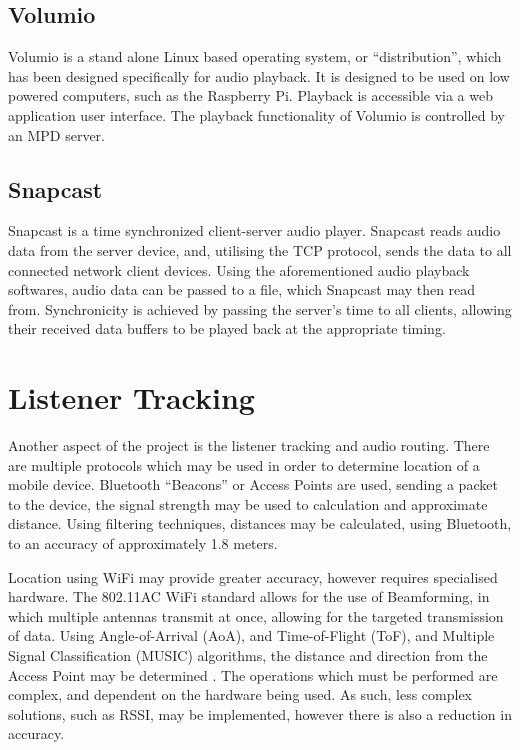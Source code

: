 \documentclass[11pt,a4paper,headinclude=false,footinclude=false]{scrreprt}
\begin{document}
\subsection{Volumio}\label{volumio}

Volumio is a stand alone Linux based operating system, or
``distribution'', which has been designed specifically for audio
playback\cite{Volumio18}. It is designed to be used on low powered
computers, such as the Raspberry Pi. Playback is accessible via a web
application user interface. The playback functionality of Volumio is
controlled by an MPD server.

\subsection{Snapcast}\label{snapcast}

Snapcast is a time synchronized client-server audio player. Snapcast
reads audio data from the server device, and, utilising the TCP
protocol, sends the data to all connected network client devices. Using
the aforementioned audio playback softwares, audio data can be passed to
a file, which Snapcast may then read from. Synchronicity is achieved by
passing the server's time to all clients, allowing their received data
buffers to be played back at the appropriate timing.

\section{Listener Tracking}\label{listener-tracking}

Another aspect of the project is the listener tracking and audio
routing. There are multiple protocols which may be used in order to
determine location of a mobile device. Bluetooth ``Beacons'' or Access
Points are used, sending a packet to the device, the signal strength may
be used to calculation and approximate distance\cite{Park15}. Using
filtering techniques, distances may be calculated, using Bluetooth, to
an accuracy of approximately 1.8 meters\cite{Park15}.

Location using WiFi may provide greater accuracy, however requires
specialised hardware\cite{Gjengset14}. The 802.11AC WiFi standard allows
for the use of Beamforming, in which multiple antennas transmit at once,
allowing for the targeted transmission of data\cite{Heejung14}. Using
Angle-of-Arrival (AoA), and Time-of-Flight (ToF), and Multiple Signal
Classification (MUSIC) algorithms, the distance and direction from the
Access Point may be determined \cite{Afaz18}. The operations which must
be performed are complex, and dependent on the hardware being used. As
such, less complex solutions, such as RSSI, may be implemented, however
there is also a reduction in accuracy.
\end{document}
